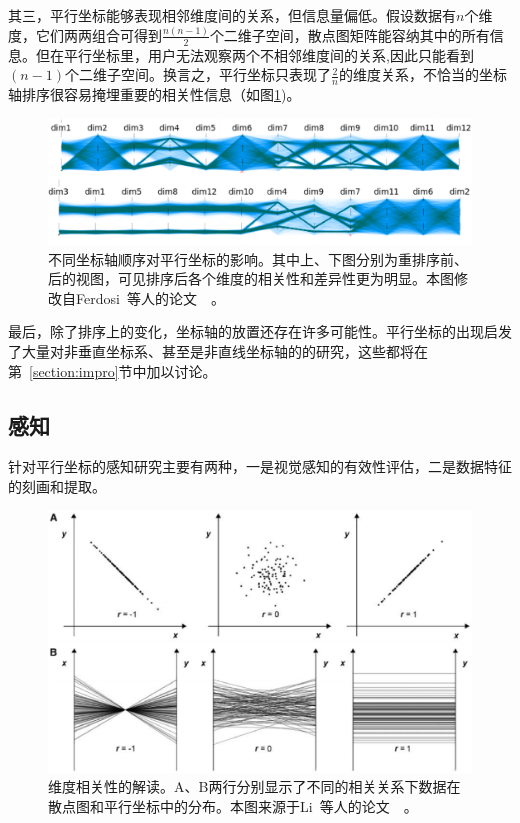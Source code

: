 \documentclass[12pt,twocolumn]{article}
\begin{document}
其三，平行坐标能够表现相邻维度间的关系，但信息量偏低。假设数据有$n$个维度，它们两两组合可得到$\frac{n(n-1)}{2}$个二维子空间，散点图矩阵能容纳其中的所有信息。但在平行坐标里，用户无法观察两个不相邻维度间的关系,因此只能看到$(n-1)$个二维子空间。换言之，平行坐标只表现了$\frac{2}{n}$的维度关系，不恰当的坐标轴排序很容易掩埋重要的相关性信息（如图\ref{fig:PC_reordering})。

\begin{figure}[!htb]
\centering
\includegraphics[width=1.0\linewidth]{images/PC_reordering.eps}
\caption{\label{fig:PC_reordering}不同坐标轴顺序对平行坐标的影响。其中上、下图分别为重排序前、后的视图，可见排序后各个维度的相关性和差异性更为明显。本图修改自Ferdosi~等人的论文~\citep{ferdosi2011visualizing}~。
}
\end{figure}

最后，除了排序上的变化，坐标轴的放置还存在许多可能性。平行坐标的出现启发了大量对非垂直坐标系、甚至是非直线坐标轴的的研究，这些都将在第~\ref{section:impro}节中加以讨论。

\subsection{感知}
\label{subsection:perceptionBasics}

针对平行坐标的感知研究主要有两种，一是视觉感知的有效性评估，二是数据特征的刻画和提取。

\begin{figure}[!htb]
\centering
\includegraphics[width=1.0\linewidth]{images/PC_correlation.eps}
\caption{\label{fig:PC_correlation}维度相关性的解读。A、B两行分别显示了不同的相关关系下数据在散点图和平行坐标中的分布。本图来源于Li~等人的论文~\citep{li2010judging}~。
}
\end{figure}
\end{document}
